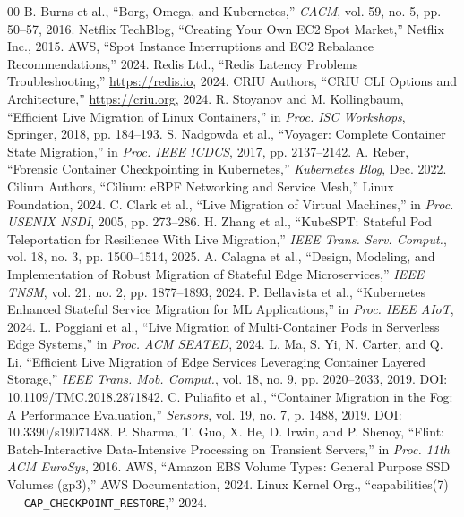 \documentclass[conference,10pt]{IEEEtran}
\begin{document}
\vspace{-4.0mm}

\begin{thebibliography}{00}
\fontsize{6.2pt}{7.1pt}\selectfont
\setlength{\itemsep}{-0.5pt}
\setlength{\parskip}{0pt}
 B. Burns et al., ``Borg, Omega, and Kubernetes,'' \textit{CACM}, vol. 59, no. 5, pp. 50--57, 2016.
 Netflix TechBlog, ``Creating Your Own EC2 Spot Market,'' Netflix Inc., 2015.
 AWS, ``Spot Instance Interruptions and EC2 Rebalance Recommendations,'' 2024.
 Redis Ltd., ``Redis Latency Problems Troubleshooting,'' \url{https://redis.io}, 2024.
 CRIU Authors, ``CRIU CLI Options and Architecture,'' \url{https://criu.org}, 2024.
 R. Stoyanov and M. Kollingbaum, ``Efficient Live Migration of Linux Containers,'' in \textit{Proc. ISC Workshops}, Springer, 2018, pp. 184--193.
 S. Nadgowda et al., ``Voyager: Complete Container State Migration,'' in \textit{Proc. IEEE ICDCS}, 2017, pp. 2137--2142.
 A. Reber, ``Forensic Container Checkpointing in Kubernetes,'' \textit{Kubernetes Blog}, Dec. 2022.
 Cilium Authors, ``Cilium: eBPF Networking and Service Mesh,'' Linux Foundation, 2024.
 C. Clark et al., ``Live Migration of Virtual Machines,'' in \textit{Proc. USENIX NSDI}, 2005, pp. 273--286.
 H. Zhang et al., ``KubeSPT: Stateful Pod Teleportation for Resilience With Live Migration,'' \textit{IEEE Trans. Serv. Comput.}, vol. 18, no. 3, pp. 1500--1514, 2025.
 A. Calagna et al., ``Design, Modeling, and Implementation of Robust Migration of Stateful Edge Microservices,'' \textit{IEEE TNSM}, vol. 21, no. 2, pp. 1877--1893, 2024.
 P. Bellavista et al., ``Kubernetes Enhanced Stateful Service Migration for ML Applications,'' in \textit{Proc. IEEE AIoT}, 2024.
 L. Poggiani et al., ``Live Migration of Multi-Container Pods in Serverless Edge Systems,'' in \textit{Proc. ACM SEATED}, 2024.
 L. Ma, S. Yi, N. Carter, and Q. Li, ``Efficient Live Migration of Edge Services Leveraging Container Layered Storage,'' \textit{IEEE Trans. Mob. Comput.}, vol. 18, no. 9, pp. 2020--2033, 2019. DOI: 10.1109/TMC.2018.2871842.
 C. Puliafito et al., ``Container Migration in the Fog: A Performance Evaluation,'' \textit{Sensors}, vol. 19, no. 7, p. 1488, 2019. DOI: 10.3390/s19071488.
 P. Sharma, T. Guo, X. He, D. Irwin, and P. Shenoy, ``Flint: Batch-Interactive Data-Intensive Processing on Transient Servers,'' in \textit{Proc. 11th ACM EuroSys}, 2016.
 AWS, ``Amazon EBS Volume Types: General Purpose SSD Volumes (gp3),'' AWS Documentation, 2024.
 Linux Kernel Org., ``capabilities(7) --- \texttt{CAP\_CHECKPOINT\_RESTORE},'' 2024.
\end{thebibliography}
\end{document}
